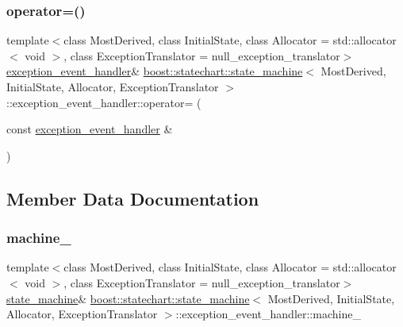 \subsubsection{\texorpdfstring{operator=()}{operator=()}}
{\footnotesize\ttfamily template$<$class Most\+Derived, class Initial\+State, class Allocator = std\+::allocator$<$ void $>$, class Exception\+Translator = null\+\_\+exception\+\_\+translator$>$ \\
\mbox{\hyperlink{classboost_1_1statechart_1_1state__machine_1_1exception__event__handler}{exception\+\_\+event\+\_\+handler}}\& \mbox{\hyperlink{classboost_1_1statechart_1_1state__machine}{boost\+::statechart\+::state\+\_\+machine}}$<$ Most\+Derived, Initial\+State, Allocator, Exception\+Translator $>$\+::exception\+\_\+event\+\_\+handler\+::operator= (\begin{DoxyParamCaption}\item[{const \mbox{\hyperlink{classboost_1_1statechart_1_1state__machine_1_1exception__event__handler}{exception\+\_\+event\+\_\+handler}} \&}]{ }\end{DoxyParamCaption})\hspace{0.3cm}{\ttfamily [private]}}



\subsection{Member Data Documentation}
\mbox{\label{classboost_1_1statechart_1_1state__machine_1_1exception__event__handler_a72a5fde90e24066f54b90f96b7bbed24}} 
\subsubsection{\texorpdfstring{machine\+\_\+}{machine\_}}
{\footnotesize\ttfamily template$<$class Most\+Derived, class Initial\+State, class Allocator = std\+::allocator$<$ void $>$, class Exception\+Translator = null\+\_\+exception\+\_\+translator$>$ \\
\mbox{\hyperlink{classboost_1_1statechart_1_1state__machine}{state\+\_\+machine}}\& \mbox{\hyperlink{classboost_1_1statechart_1_1state__machine}{boost\+::statechart\+::state\+\_\+machine}}$<$ Most\+Derived, Initial\+State, Allocator, Exception\+Translator $>$\+::exception\+\_\+event\+\_\+handler\+::machine\+\_\+\hspace{0.3cm}{\ttfamily [private]}}

